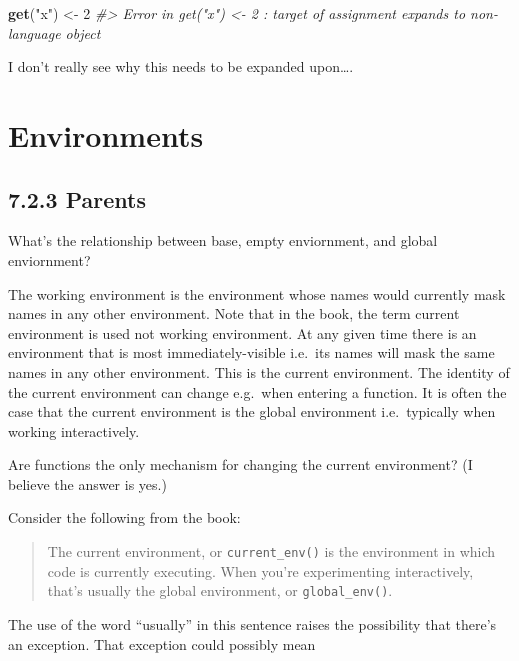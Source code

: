 \documentclass[]{book}
\newenvironment{Shaded}{\begin{snugshade}}{\end{snugshade}}
\newcommand{\CommentTok}[1]{\textcolor[rgb]{0.56,0.35,0.01}{\textit{#1}}}
\newcommand{\DecValTok}[1]{\textcolor[rgb]{0.00,0.00,0.81}{#1}}
\newcommand{\KeywordTok}[1]{\textcolor[rgb]{0.13,0.29,0.53}{\textbf{#1}}}
\newcommand{\NormalTok}[1]{#1}
\newcommand{\StringTok}[1]{\textcolor[rgb]{0.31,0.60,0.02}{#1}}
\begin{document}
\begin{Shaded}
\begin{Highlighting}[]
\KeywordTok{get}\NormalTok{(}\StringTok{"x"}\NormalTok{) <-}\StringTok{ }\DecValTok{2}
\CommentTok{#> Error in get("x") <- 2 : target of assignment expands to non-language object}
\end{Highlighting}
\end{Shaded}

I don't really see why this needs to be expanded upon\ldots{}.

\hypertarget{environments}{%
\chapter{Environments}\label{environments}}

\hypertarget{parents}{%
\section*{7.2.3 Parents}\label{parents}}

What's the relationship between base, empty enviornment, and global enviornment?

The working environment is the environment whose names would currently mask names in any other environment. Note that in the book, the term current environment is used not working environment. At any given time there is an environment that is most immediately-visible i.e.~its names will mask the same names in any other environment. This is the current environment. The identity of the current environment can change e.g.~when entering a function. It is often the case that the current environment is the global environment i.e.~typically when working interactively.

Are functions the only mechanism for changing the current environment? (I believe the answer is yes.)

Consider the following from the book:

\begin{quote}
The current environment, or \texttt{current\_env()} is the environment in which code is currently executing. When you're experimenting interactively, that's usually the global environment, or \texttt{global\_env()}.
\end{quote}

The use of the word ``usually'' in this sentence raises the possibility that there's an exception. That exception could possibly mean
\end{document}
